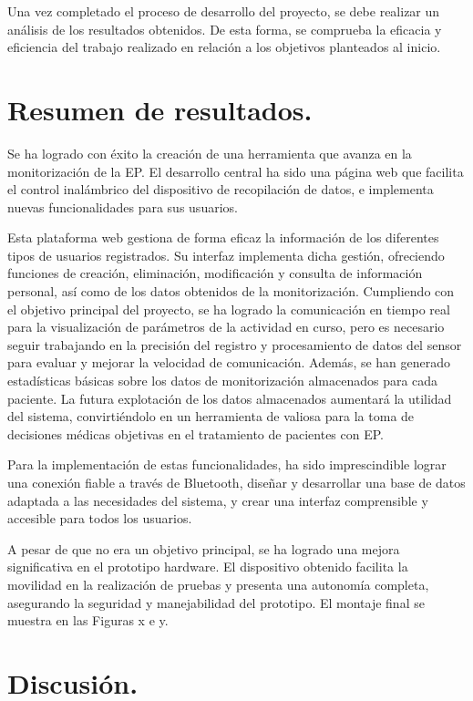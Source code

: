 
Una vez completado el proceso de desarrollo del proyecto, se debe realizar un análisis de los resultados obtenidos. De esta forma, se comprueba la eficacia y eficiencia del trabajo realizado en relación a los objetivos planteados al inicio.

\section{Resumen de resultados.}

Se ha logrado con éxito la creación de una herramienta que avanza en la monitorización de la EP. El desarrollo central ha sido una página web que facilita el control inalámbrico del dispositivo de recopilación de datos, e implementa nuevas funcionalidades para sus usuarios.

Esta plataforma web gestiona de forma eficaz la información de los diferentes tipos de usuarios registrados. Su interfaz implementa dicha gestión, ofreciendo funciones de creación, eliminación, modificación y consulta de información personal, así como de los datos obtenidos de la monitorización. Cumpliendo con el objetivo principal del proyecto, se ha logrado la comunicación en tiempo real para la visualización de parámetros de la actividad en curso, pero es necesario seguir trabajando en la precisión del registro y procesamiento de datos del sensor para evaluar y mejorar la velocidad de comunicación. Además, se han generado estadísticas básicas sobre los datos de monitorización almacenados para cada paciente. La futura explotación de los datos almacenados aumentará la utilidad del sistema, convirtiéndolo en un herramienta de valiosa para la toma de decisiones médicas objetivas en el tratamiento de pacientes con EP.

Para la implementación de estas funcionalidades, ha sido imprescindible lograr una conexión fiable a través de Bluetooth, diseñar y desarrollar una base de datos adaptada a las necesidades del sistema, y crear una interfaz comprensible y accesible para todos los usuarios.

A pesar de que no era un objetivo principal, se ha logrado una mejora significativa en el prototipo hardware. El dispositivo obtenido facilita la movilidad en la realización de pruebas y presenta una autonomía completa, asegurando la seguridad y manejabilidad del prototipo. El montaje final se muestra en las Figuras x e y.

\section{Discusión.}

